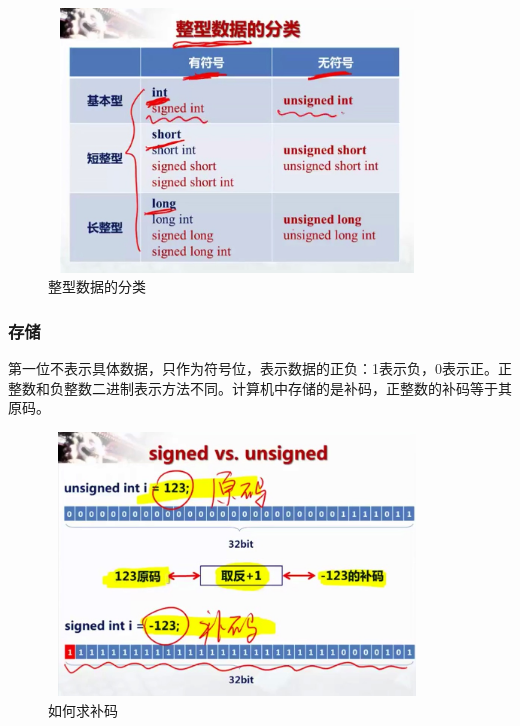 \documentclass[UTF8]{article}
\begin{document}
\begin{figure}[!htb]
\centering
\includegraphics[width=10cm,height=7cm]{inttype1.jpg}
\caption{整型数据的分类}
\hspace{0.05in}
\end{figure}
\subsubsection{存储}
第一位不表示具体数据，只作为符号位，表示数据的正负：1表示负，0表示正。正整数和负整数二进制表示方法不同。计算机中存储的是补码，正整数的补码等于其原码。
\begin{figure}[!htb]
\centering
\includegraphics[width=10cm,height=7cm]{buma.jpg}
\caption{如何求补码}
\hspace{0.05in}
\end{figure}
\end{document}
